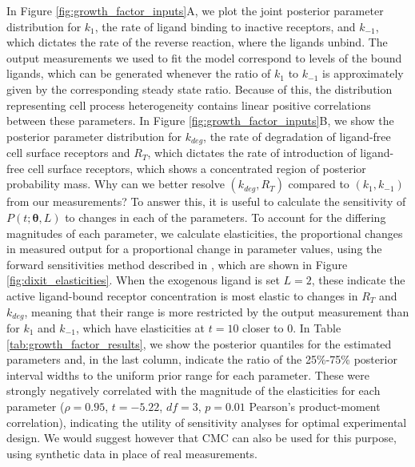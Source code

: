 In Figure \ref{fig:growth_factor_inputs}A, we plot the joint posterior parameter distribution for $k_1$, the rate of ligand binding to inactive receptors, and $k_{-1}$, which dictates the rate of the reverse reaction, where the ligands unbind. The output measurements we used to fit the model correspond to levels of the bound ligands, which can be generated whenever the ratio of $k_1$ to $k_{-1}$ is approximately given by the corresponding steady state ratio. Because of this, the distribution representing cell process heterogeneity contains linear positive correlations between these parameters. In Figure \ref{fig:growth_factor_inputs}B, we show the posterior parameter distribution for $k_{deg}$, the rate of degradation of ligand-free cell surface receptors and $R_T$, which dictates the rate of introduction of ligand-free cell surface receptors, which shows a concentrated region of posterior probability mass. Why can we better resolve $(k_{deg},R_T)$ compared to $(k_1,k_{-1})$ from our measurements? To answer this, it is useful to calculate the sensitivity of $P(t; \boldsymbol{\theta}, L)$ to changes in each of the parameters. To account for the differing magnitudes of each parameter, we calculate elasticities, the proportional changes in measured output for a proportional change in parameter values, using the forward sensitivities method described in \cite{DGCT2018}, which are shown in Figure \ref{fig:dixit_elasticities}. When the exogenous ligand is set $L=2$, these indicate the active ligand-bound receptor concentration is most elastic to changes in $R_T$ and $k_{deg}$, meaning that their range is more restricted by the output measurement than for $k_1$ and $k_{-1}$, which have elasticities at $t=10$ closer to 0. In Table \ref{tab:growth_factor_results}, we show the posterior quantiles for the estimated parameters and, in the last column, indicate the ratio of the 25\%-75\% posterior interval widths to the uniform prior range for each parameter. These were strongly negatively correlated with the magnitude of the elasticities for each parameter ($\rho=0.95$, $t=-5.22$, $df=3$, $p=0.01$ Pearson's product-moment correlation), indicating the utility of sensitivity analyses for optimal experimental design. We would suggest however that CMC can also be used for this purpose, using synthetic data in place of real measurements.



